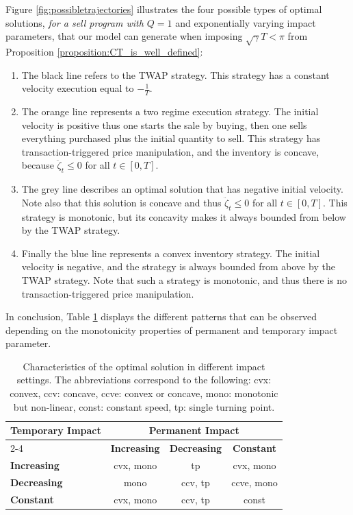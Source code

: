 \documentclass[final,3p,authoryear,12pt]{elsarticle}
\newtheorem{remark}{Remark}
\begin{document}
    Figure \ref{fig:possibletrajectories} illustrates the four possible types of optimal solutions, \emph{for a sell program with $Q=1$} and exponentially varying impact parameters, that our model can generate when imposing $\sqrt{\gamma}T < \pi$ from Proposition \ref{proposition:CT_is_well_defined}:
    \begin{enumerate}
        \item The black line refers to the TWAP strategy. This strategy has a constant velocity execution equal to $-\frac{1}{T}$. 
        \item The orange line represents a two regime execution strategy. The initial velocity is positive thus one starts the sale by buying, then one sells everything purchased plus the initial quantity to sell. This strategy has transaction-triggered price manipulation, and the inventory is concave, because $\ddot \zeta_{t} \le 0$ for all $t\in[0,T]$. 
        \item The grey line describes an optimal solution that has negative initial velocity. Note also that this solution is concave and thus $\ddot \zeta_{t} \le 0$ for all $t\in[0,T]$. This strategy is monotonic, but its concavity makes it always bounded from below by the TWAP strategy. 
        \item Finally the blue line represents a convex inventory strategy. The initial velocity is negative, and the strategy is always bounded from above by the TWAP strategy. Note that such a strategy is monotonic, and thus there is no transaction-triggered price manipulation. 
    \end{enumerate}

In conclusion, Table \ref{tab:impactAnalysis} displays the different patterns that can be observed depending on the monotonicity properties of permanent and temporary impact parameter.

\begin{table}[ht]
\centering
\begin{tabular}{|l|c|c|c|}
\hline
\multirow{2}{*}{{\textbf{Temporary Impact}}} & \multicolumn{3}{c|}{\textbf{Permanent Impact}} \\ \cline{2-4} 
 & \textbf{Increasing} & \textbf{Decreasing} & \textbf{Constant} \\ \hline
\textbf{Increasing} &  cvx, mono &  tp &  cvx, mono \\ \hline
\textbf{Decreasing} &  mono &  ccv, tp & ccve, mono \\  \hline
\textbf{Constant} & cvx, mono &  ccv, tp &  const \\ \hline
\end{tabular}
\caption{Characteristics of the optimal solution in different impact settings. The abbreviations correspond to the following: cvx: convex, ccv: concave, ccve: convex or concave, mono: monotonic but non-linear, const: constant speed, tp: single turning point.}
\label{tab:impactAnalysis}
\end{table}
\end{document}
